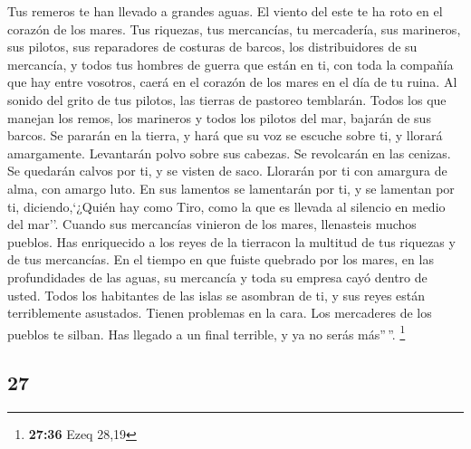 \begin{paracol}{2}
 Tus remeros te han llevado a grandes aguas. El viento
del este te ha roto en el corazón de los mares.  Tus
riquezas, tus mercancías, tu mercadería, sus marineros, sus pilotos, sus
reparadores de costuras de barcos, los distribuidores de su mercancía, y
todos tus hombres de guerra que están en ti, con toda la compañía que
hay entre vosotros, caerá en el corazón de los mares en el día de tu
ruina.  Al sonido del grito de tus pilotos, las tierras
de pastoreo temblarán.  Todos los que manejan los remos,
los marineros y todos los pilotos del mar, bajarán de sus barcos. Se
pararán en la tierra,  y hará que su voz se escuche sobre
ti, y llorará amargamente. Levantarán polvo sobre sus cabezas. Se
revolcarán en las cenizas.  Se quedarán calvos por ti, y
se visten de saco. Llorarán por ti con amargura de alma, con amargo
luto.  En sus lamentos se lamentarán por ti, y se
lamentan por ti, diciendo,`¿Quién hay como Tiro, como la que es llevada
al silencio en medio del mar''.  Cuando sus mercancías
vinieron de los mares, llenasteis muchos pueblos. Has enriquecido a los
reyes de la tierracon la multitud de tus riquezas y de tus mercancías.
 En el tiempo en que fuiste quebrado por los mares, en
las profundidades de las aguas, su mercancía y toda su empresa cayó
dentro de usted.  Todos los habitantes de las islas se
asombran de ti, y sus reyes están terriblemente asustados. Tienen
problemas en la cara.  Los mercaderes de los pueblos te
silban. Has llegado a un final terrible, y ya no serás más''\,''.
\footnote{\textbf{27:36} Ezeq 28,19}

\switchcolumn
\begin{otherlanguage}{english}

\hypertarget{section-53}{%
\section{27}\label{section-53}}


\end{otherlanguage}
\end{paracol}
